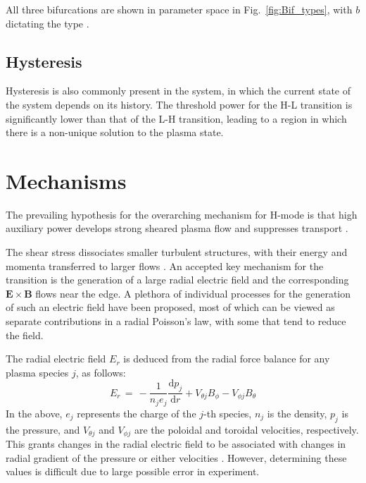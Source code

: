 All three bifurcations are shown in parameter space in Fig.~\ref{fig:Bif_types}, with $b$ dictating the type \cite{weymiens_bifurcation_2014}.

\subsection{Hysteresis}
Hysteresis is also commonly present in the system, in which the current state of the system depends on its history.
The threshold power for the H-L transition is significantly lower than that of the L-H transition, leading to a region in which there is a non-unique solution to the plasma state.


\section{Mechanisms}
The prevailing hypothesis for the overarching mechanism for H-mode is that high auxiliary power develops strong sheared plasma flow and suppresses transport \cite{freidberg_plasma_2007}.

The shear stress dissociates smaller turbulent structures, with their energy and momenta transferred to larger flows \cite{staps_backstepping_2017}.
An accepted key mechanism for the transition is the generation of a large radial electric field and the corresponding $\mathbf{E}\times\mathbf{B}$ flows near the edge.
A plethora of individual processes for the generation of such an electric field have been proposed, most of which can be viewed as separate contributions in a radial Poisson's law, with some that tend to reduce the field.

The radial electric field $E_r$ is deduced from the radial force balance for any plasma species $j$, as follows:
\begin{equation}
	E_r \,=\, -\frac{1}{n_j e_j} \frac{\text{d} p_j}{\text{d} r} + V_{\theta j} B_\phi - V_{\phi j} B_\theta
	\label{eq:E_r}
\end{equation}
In the above, $e_j$ represents the charge of the $j$-th species, $n_j$ is the density, $p_j$ is the pressure, and $V_{\theta j}$ and $V_{\phi j}$ are the poloidal and toroidal velocities, respectively.
This grants changes in the radial electric field to be associated with changes in radial gradient of the pressure or either velocities \cite{connor_review_2000}\cite{staps_backstepping_2017}.
However, determining these values is difficult due to large possible error in experiment.

